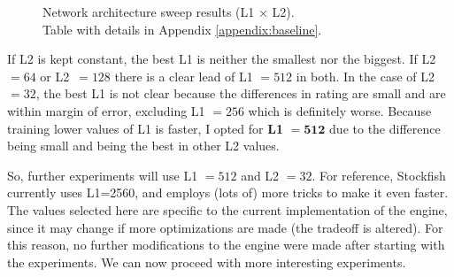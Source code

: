 \begin{figure}[H]
\centering
{}
\captionsetup{justification=centering}
\caption{Network architecture sweep results (L1 $\times$ L2).\\ Table with details in Appendix \ref{appendix:baseline}.}
\label{fig:baseline_heatmaps}
\end{figure}

If L2 is kept constant, the best L1 is neither the smallest nor the biggest. If L2 $=64$ or \mbox{L2 $=128$} there is a clear lead of L1 $=512$ in both. In the case of L2 $=32$, the best L1 is not clear because the differences in rating are small and are within margin of error, excluding L1 $=256$ which is definitely worse. Because training lower values of L1 is faster, I opted for \textbf{L1} $\bm{=512}$ due to the difference being small and being the best in other L2 values.

So, further experiments will use L1 $=512$ and L2 $=32$. For reference, Stockfish currently uses L1=2560, and employs (lots of) more tricks to make it even faster. The values selected here are specific to the current implementation of the engine, since it may change if more optimizations are made (the tradeoff is altered). For this reason, no further modifications to the engine were made after starting with the experiments. We can now proceed with more interesting experiments.
